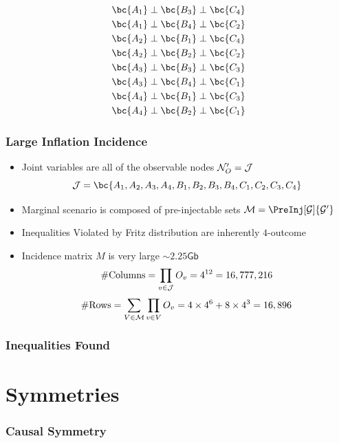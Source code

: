 \documentclass[
    hyperref={colorlinks=true, linkcolor=blue, urlcolor=blue, citecolor=MidnightBlue},
    xcolor={dvipsnames},
]{beamer}
\begin{document}
\begin{frame}
\begin{equation*}
\begin{gathered}
            \bc{A_1} \ancestralindep \bc{B_3} \ancestralindep \bc{C_4} \\
            \bc{A_1} \ancestralindep \bc{B_4} \ancestralindep \bc{C_2} \\
            \bc{A_2} \ancestralindep \bc{B_1} \ancestralindep \bc{C_4} \\
            \bc{A_2} \ancestralindep \bc{B_2} \ancestralindep \bc{C_2} \\
            \bc{A_3} \ancestralindep \bc{B_3} \ancestralindep \bc{C_3} \\
            \bc{A_3} \ancestralindep \bc{B_4} \ancestralindep \bc{C_1} \\
            \bc{A_4} \ancestralindep \bc{B_1} \ancestralindep \bc{C_3} \\
            \bc{A_4} \ancestralindep \bc{B_2} \ancestralindep \bc{C_1}
        \end{gathered}
    \end{equation*}
\end{frame}


\begin{frame}
    \frametitle{Large Inflation Incidence}
    \begin{itemize}
        \item Joint variables are all of the observable nodes $\mathcal{N}_O' = \mathcal{J}$
        \[ \jointvar = \bc{A_1, A_2, A_3, A_4,B_1, B_2, B_3, B_4,C_1, C_2, C_3, C_4} \]
        \item Marginal scenario is composed of pre-injectable sets $\mscenario = \PreInj[\graph]{\graph'}$
        \item Inequalities Violated by Fritz distribution are inherently $4$-outcome
        \item Incidence matrix $M$ is very large $\sim 2.25 \textsf{Gb}$
        \[ \# \text{Columns} = \prod_{v \in \mathcal{J}} O_{v} = 4^{12} = 16,777,216 \]
        \[ \# \text{Rows} = \sum_{V \in \mathcal{M}} \prod_{v \in V} O_{v} = 4\times 4^{6} + 8 \times 4^{3} = 16,896 \]
    \end{itemize}
\end{frame}

\begin{frame}
    \frametitle{Inequalities Found}
\end{frame}

\section{Symmetries}
\begin{frame}
    \frametitle{Causal Symmetry}
\end{frame}
\end{document}
